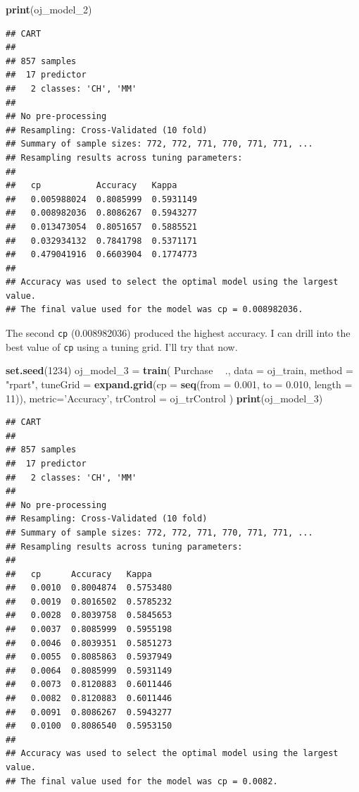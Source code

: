 \documentclass[
]{book}
\newenvironment{Shaded}{\begin{snugshade}}{\end{snugshade}}
\newcommand{\DataTypeTok}[1]{\textcolor[rgb]{0.13,0.29,0.53}{#1}}
\newcommand{\DecValTok}[1]{\textcolor[rgb]{0.00,0.00,0.81}{#1}}
\newcommand{\FloatTok}[1]{\textcolor[rgb]{0.00,0.00,0.81}{#1}}
\newcommand{\KeywordTok}[1]{\textcolor[rgb]{0.13,0.29,0.53}{\textbf{#1}}}
\newcommand{\NormalTok}[1]{#1}
\newcommand{\OperatorTok}[1]{\textcolor[rgb]{0.81,0.36,0.00}{\textbf{#1}}}
\newcommand{\StringTok}[1]{\textcolor[rgb]{0.31,0.60,0.02}{#1}}
\begin{document}
\begin{Shaded}
\begin{Highlighting}[]
\KeywordTok{print}\NormalTok{(oj_model_}\DecValTok{2}\NormalTok{)}
\end{Highlighting}
\end{Shaded}

\begin{verbatim}
## CART 
## 
## 857 samples
##  17 predictor
##   2 classes: 'CH', 'MM' 
## 
## No pre-processing
## Resampling: Cross-Validated (10 fold) 
## Summary of sample sizes: 772, 772, 771, 770, 771, 771, ... 
## Resampling results across tuning parameters:
## 
##   cp           Accuracy   Kappa    
##   0.005988024  0.8085999  0.5931149
##   0.008982036  0.8086267  0.5943277
##   0.013473054  0.8051657  0.5885521
##   0.032934132  0.7841798  0.5371171
##   0.479041916  0.6603904  0.1774773
## 
## Accuracy was used to select the optimal model using the largest value.
## The final value used for the model was cp = 0.008982036.
\end{verbatim}

The second \texttt{cp} (0.008982036) produced the highest accuracy. I can drill into the best value of \texttt{cp} using a tuning grid. I'll try that now.

\begin{Shaded}
\begin{Highlighting}[]
\KeywordTok{set.seed}\NormalTok{(}\DecValTok{1234}\NormalTok{)}
\NormalTok{oj_model_}\DecValTok{3}\NormalTok{ =}\StringTok{ }\KeywordTok{train}\NormalTok{(}
\NormalTok{   Purchase }\OperatorTok{~}\StringTok{ }\NormalTok{., }
   \DataTypeTok{data =}\NormalTok{ oj_train, }
   \DataTypeTok{method =} \StringTok{"rpart"}\NormalTok{,}
   \DataTypeTok{tuneGrid =} \KeywordTok{expand.grid}\NormalTok{(}\DataTypeTok{cp =} \KeywordTok{seq}\NormalTok{(}\DataTypeTok{from =} \FloatTok{0.001}\NormalTok{, }\DataTypeTok{to =} \FloatTok{0.010}\NormalTok{, }\DataTypeTok{length =} \DecValTok{11}\NormalTok{)),  }
   \DataTypeTok{metric=}\StringTok{'Accuracy'}\NormalTok{,}
   \DataTypeTok{trControl =}\NormalTok{ oj_trControl}
\NormalTok{   )}
\KeywordTok{print}\NormalTok{(oj_model_}\DecValTok{3}\NormalTok{)}
\end{Highlighting}
\end{Shaded}

\begin{verbatim}
## CART 
## 
## 857 samples
##  17 predictor
##   2 classes: 'CH', 'MM' 
## 
## No pre-processing
## Resampling: Cross-Validated (10 fold) 
## Summary of sample sizes: 772, 772, 771, 770, 771, 771, ... 
## Resampling results across tuning parameters:
## 
##   cp      Accuracy   Kappa    
##   0.0010  0.8004874  0.5753480
##   0.0019  0.8016502  0.5785232
##   0.0028  0.8039758  0.5845653
##   0.0037  0.8085999  0.5955198
##   0.0046  0.8039351  0.5851273
##   0.0055  0.8085863  0.5937949
##   0.0064  0.8085999  0.5931149
##   0.0073  0.8120883  0.6011446
##   0.0082  0.8120883  0.6011446
##   0.0091  0.8086267  0.5943277
##   0.0100  0.8086540  0.5953150
## 
## Accuracy was used to select the optimal model using the largest value.
## The final value used for the model was cp = 0.0082.
\end{verbatim}
\end{document}
